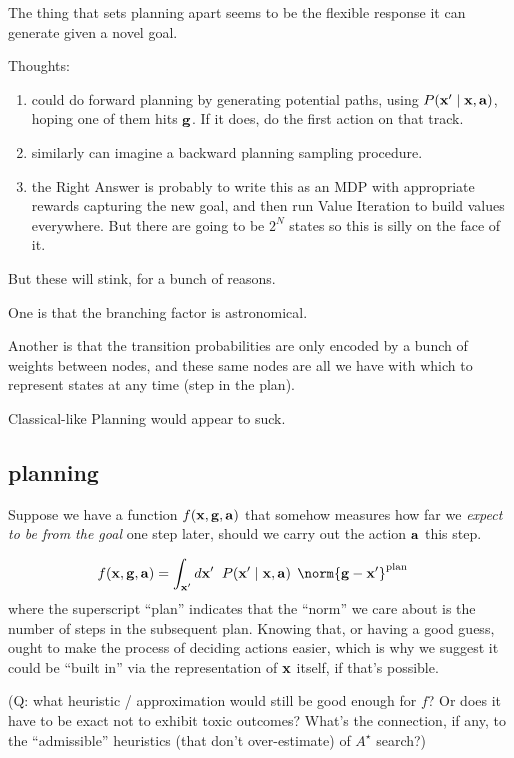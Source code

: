 \documentclass[11pt]{article}
\begin{document}
The thing that sets planning apart seems to be the flexible response it can generate given a novel goal.

Thoughts:
\begin{enumerate}
 \item could do forward planning by generating potential paths, using $P(\mathbf{x}^\prime \mid \mathbf{x}, \mathbf{a})$, hoping one of them hits $\mathbf{g}$. If it does, do the first action on that track.
 \item similarly can imagine a backward planning sampling procedure.
 \item the Right Answer is probably to write this as an MDP with appropriate rewards capturing the new goal, and then run Value Iteration to build values everywhere. But there are going to be $2^N$ states so this is silly on the face of it.
\end{enumerate}
But these will stink, for a bunch of reasons.

One is that the branching factor is astronomical.

Another is that the transition probabilities are only encoded by a bunch of weights between nodes, and these same nodes are all we have with which to represent states at any time (step in the plan).

Classical-like Planning would appear to suck.

\subsection{planning}

Suppose we have a function $f(\mathbf{x},\mathbf{g},\mathbf{a})$ that somehow measures how far we {\it expect to be from the goal} one step later, should we carry out the action $\mathbf{a}$ this step.


\begin{align*}
 f(\bx,\bg,\ba) 
 &= \int_{\bx^\prime} d \bx^\prime \;\;P(\bx^\prime \mid \bx, \ba) \;\,  \norm{ \bg - \bx^\prime }^\text{plan}
\end{align*}
where the superscript ``plan'' indicates that the ``norm'' we care about is the number of steps in the subsequent plan. Knowing that, or having a good guess, ought to make the process of deciding actions easier, which is why we suggest it could be ``built in'' via the representation of $\mathbf{x}$ itself, if that's possible.

(Q: what heuristic / approximation would still be good enough for $f$? Or does it have to be exact not to exhibit toxic outcomes? What's the connection, if any, to the ``admissible'' heuristics (that don't over-estimate) of $A^\star$ search?)
\end{document}
